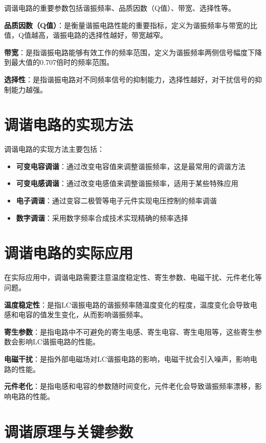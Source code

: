 \documentclass[12pt,UTF8]{ctexbook}
\begin{document}
调谐电路的重要参数包括谐振频率、品质因数（Q值）、带宽、选择性等。

\textbf{品质因数（Q值）}：是衡量谐振电路性能的重要指标，定义为谐振频率与带宽的比值，Q值越高，谐振电路的选择性越好，带宽越窄。

\textbf{带宽}：是指谐振电路能够有效工作的频率范围，定义为谐振频率两侧信号幅度下降到最大值的0.707倍时的频率范围。

\textbf{选择性}：是指谐振电路对不同频率信号的抑制能力，选择性越好，对干扰信号的抑制能力越强。

\section{调谐电路的实现方法}

调谐电路的实现方法主要包括：

\begin{itemize}[leftmargin=3.5em]
    \item \textbf{可变电容调谐}：通过改变电容值来调整谐振频率，这是最常用的调谐方法
    \item \textbf{可变电感调谐}：通过改变电感值来调整谐振频率，适用于某些特殊应用
    \item \textbf{电子调谐}：通过变容二极管等电子元件实现电压控制的频率调谐
    \item \textbf{数字调谐}：采用数字频率合成技术实现精确的频率选择
\end{itemize}

\section{调谐电路的实际应用}

在实际应用中，调谐电路需要注意温度稳定性、寄生参数、电磁干扰、元件老化等问题。

\textbf{温度稳定性}：是指LC谐振电路的谐振频率随温度变化的程度，温度变化会导致电感和电容的值发生变化，从而影响谐振频率。

\textbf{寄生参数}：是指电路中不可避免的寄生电感、寄生电容、寄生电阻等，这些寄生参数会影响LC谐振电路的性能。

\textbf{电磁干扰}：是指外部电磁场对LC谐振电路的影响，电磁干扰会引入噪声，影响电路的性能。

\textbf{元件老化}：是指电感和电容的参数随时间变化，元件老化会导致谐振频率漂移，影响电路的性能。

\section{调谐原理与关键参数}
\end{document}
